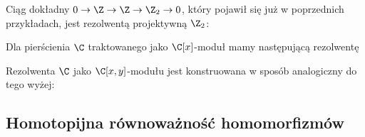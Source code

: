 \begin{example}
\item Ciąg dokładny $0\to \Z\to \Z\to \Z_2\to 0$, który pojawił się już w poprzednich przykładach, jest rezolwentą projektywną $\Z_2$:
  \begin{center}\end{center}
\item Dla pierścienia $\C$ traktowanego jako $\C[x]$-moduł mamy następującą rezolwentę
  \begin{center}\end{center}
\item Rezolwenta $\C$ jako $\C[x, y]$-modułu jest konstruowana w sposób analogiczny do tego wyżej:
  \begin{center}\end{center}
\end{example}

\subsection{Homotopijna równoważność homomorfizmów} 

